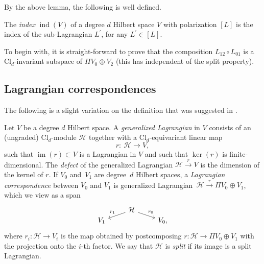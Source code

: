 \documentclass[pdftex]{sigma}
\numberwithin{equation}{section}
\DeclareMathOperator{\im}{\mathrm{im}}
\newcommand{\ind}{\operatorname{ind}}
\newcommand{\Cl}{\mathrm{Cl}}
\begin{document}
By the above lemma, the following is well defined.

\begin{Definition} \label{DefinitionIndexHilbertSpace}
The \emph{index} $\ind(V)$ of a degree $d$ Hilbert space $V$ with polarization $[L]$ is the index of the sub-Lagrangian $L^\prime$, for any $L^\prime \in [L]$.
\end{Definition}

To begin with, it is straight-forward to prove that the composition $L_{12} \circ L_{01}$ is a $\Cl_d$-invariant subspace of $\Pi V_0 \oplus V_2$ (this has independent of the split property).

\subsection{Lagrangian correspondences}

The following is a slight variation on the definition that was suggested in \cite[Definition~2.2.9]{StolzTeichnerElliptic}.

\begin{Definition}
\label{DefinitionGeneralizedLagrangians}
Let $V$ be a degree $d$ Hilbert space.
A \emph{generalized Lagrangian} in $V$ consists of an (ungraded) $\Cl_{d}$-module $\mathcal{H}$ together with a $\Cl_d$-equivariant linear map
\begin{equation*}
r\colon\ \mathcal{H} \longrightarrow V,
\end{equation*}
such that $\im(r) \subset V$ is a Lagrangian in $V$ and such that $\ker(r)$ is finite-dimensional.
The \emph{defect} of the generalized Lagrangian $\mathcal{H} \stackrel{r}{\to} V$ is the dimension of the kernel of $r$.
If $V_0$ and~$V_1$ are degree~$d$ Hilbert spaces, a \emph{Lagrangian correspondence} between $V_0$ and $V_1$ is generalized Lagrangian~${\mathcal{H} \stackrel{r}{\to} \Pi V_0 \oplus V_1}$, which we view as a span
\begin{equation*}
\begin{tikzcd}[row sep = 0.2mm]
 & \mathcal{H} \ar[dl, "r_1"'] \ar[dr, "r_0"] &\\
 V_1 & & V_0,
\end{tikzcd}
\end{equation*}
 where $r_i \colon \mathcal{H} \to V_i$ is the map obtained by postcomposing $r\colon \mathcal{H} \to \Pi V_0 \oplus V_1$ with the projection onto the $i$-th factor.
 We say that $\mathcal{H}$ is \emph{split} if its image is a split Lagrangian.
\end{Definition}
\end{document}
